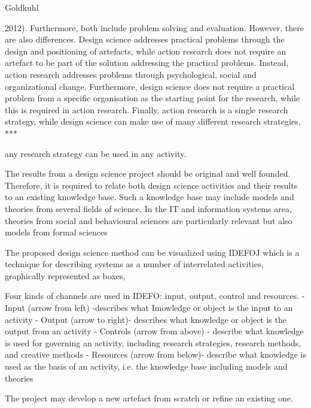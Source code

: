 Goldkuhl {2012). Furthermore, both include problem solving and evaluation.
However, there are also differences. Design science addresses
practical problems through the design and positioning of artefacts,
while action research does not require an artefact to be part of the solution
addressing the practical problems. Instead, action research addresses
problems through psychological, social and organizational
change. Furthermore, design science does not require a practical problem
from a specific organisation as the starting point for the research,
while this is required in action research. Finally, action research is a
single research strategy, while design science can make use of many
different research strategies,
***

any research strategy
can be used in any activity.


The results from a design science project should be original and well
founded. Therefore, it is required to relate both design science activities
and their results to an existing knowledge base. Such a
knowledge base may include models and theories from several fields
of science. In the IT and information systems area, theories from
social and behavioural sciences are particularly relevant but also
models from formal sciences




The proposed design science method can be visualized using IDEFOJ
which is a technique for describing systems as a number of interrelated
activities, graphically represented as boxes,

Four kinds of channels are used in IDEFO: input, output, control and
resources.
- Input (arrow from left) -describes what Imowledge or object
is the input to an activity
- Output (arrow to right)- describes what knowledge or object
is the output from an activity
- Controls (arrow from above) - describe what knowledge is
used for governing an activity, including research strategies,
research methods, and creative methods
- Resources (arrow from below)- describe what knowledge is
used as the basis of an activity, i.e. the knowledge base including
models and theories



The project may develop a
new artefact from scratch or refine an existing one.

}
